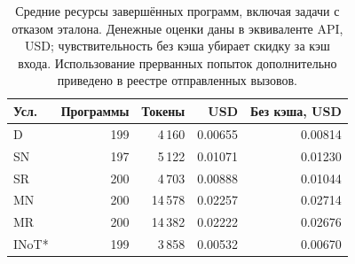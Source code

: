 \begin{table}[htbp]\centering\small
\caption{Средние ресурсы завершённых программ, включая задачи с отказом эталона. Денежные оценки даны в эквиваленте API, USD; чувствительность без кэша убирает скидку за кэш входа. Использование прерванных попыток дополнительно приведено в реестре отправленных вызовов.}\label{tab:heldout-resources}
\begin{tabular}{lrrrr}\toprule
Усл. & Программы & Токены & USD & Без кэша, USD\\
\midrule
D & 199 & 4\,160 & 0.00655 & 0.00814\\
SN & 197 & 5\,122 & 0.01071 & 0.01230\\
SR & 200 & 4\,703 & 0.00888 & 0.01044\\
MN & 200 & 14\,578 & 0.02257 & 0.02714\\
MR & 200 & 14\,382 & 0.02222 & 0.02676\\
INoT* & 199 & 3\,858 & 0.00532 & 0.00670\\
\bottomrule\end{tabular}\end{table}
